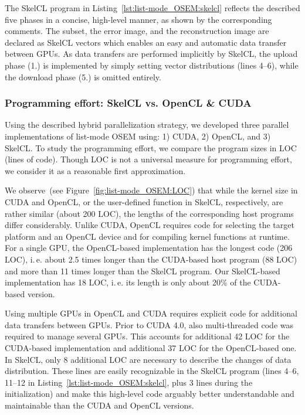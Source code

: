 The SkelCL program in Listing~\ref{lst:list-mode_OSEM:skelcl} reflects the described five phases in a concise, high-level manner, as shown by the corresponding comments.
The subset, the error image, and the reconstruction image are declared as SkelCL vectors which enables an easy and automatic data transfer between GPUs.
As data transfers are performed implicitly by SkelCL, the upload phase (1.) is implemented by simply setting vector distributions (lines 4--6), while the download phase (5.) is omitted entirely.

\subsubsection{Programming effort: SkelCL vs. OpenCL \& CUDA}
\label{sec:list-mode_OSEM:implementation}

Using the described hybrid parallelization strategy, we developed three parallel implementations of list-mode OSEM using: 1) CUDA, 2) OpenCL, and 3) SkelCL. %
To study the programming effort, we compare the program sizes in LOC (lines of code).
Though LOC is not a universal measure for programming effort, we consider it as a reasonable first approximation.

We observe~(see Figure~\ref{fig:list-mode_OSEM:LOC}) that while the kernel size in CUDA and OpenCL, or the user-defined function in SkelCL, respectively, are rather similar (about 200 LOC), the lengths of the corresponding host programs differ considerably.
Unlike CUDA, OpenCL requires code for selecting the target platform and an OpenCL device and for compiling kernel functions at runtime.
For a single GPU, the OpenCL-based implementation has the longest code (206 LOC), i.\,e. about 2.5 times longer than the CUDA-based host program (88 LOC) and more than 11 times longer than the SkelCL program.
Our SkelCL-based implementation has 18 LOC, i.\,e. its length is only about 20\% of the CUDA-based version.

Using multiple GPUs in OpenCL and CUDA requires explicit code for additional data transfers between GPUs.
Prior to CUDA 4.0, also multi-threaded code was required to manage several GPUs.
This accounts for additional 42 LOC for the CUDA-based implementation and additional 37 LOC for the OpenCL-based one.
In SkelCL, only 8 additional LOC are necessary to describe the changes of data distribution.
These lines are easily recognizable in the SkelCL program (lines 4--6, 11--12 in Listing~\ref{lst:list-mode_OSEM:skelcl}, plus 3 lines during the initialization) and make this high-level code arguably better understandable and maintainable than the CUDA and OpenCL versions.

